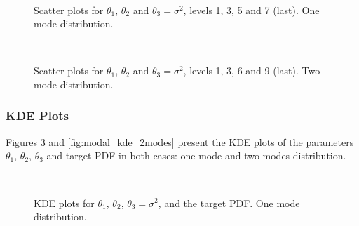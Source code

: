 \begin{figure}[htpb]
\centering
\\
\vspace{-10pt}
\caption{Scatter plots for $\theta_1$, $\theta_2$ and $\theta_3=\sigma^2$, levels 1, 3, 5 and 7 (last). One mode distribution.}
\label{fig:modal_scatter_1mode}
\end{figure}

\begin{figure}[htpb]
\centering
\\
\vspace{-10pt}
\caption{Scatter plots for $\theta_1$, $\theta_2$ and $\theta_3=\sigma^2$, levels 1, 3, 6 and 9 (last). Two-mode distribution.}
\label{fig:modal_scatter_2modes}
\end{figure}

\subsubsection{KDE Plots}

Figures \ref{fig:modal_kde_1mode} and \ref{fig:modal_kde_2modes} present the KDE plots of the parameters $\theta_1$, $\theta_2$, $\theta_3$ and target PDF in both cases: one-mode and two-modes distribution. 



\begin{figure}[hptb]
\centering
{}
\\
\vspace{-10pt}
\caption{KDE plots for $\theta_1$, $\theta_2$, $\theta_3=\sigma^2$, and the target PDF. One mode distribution.}
\label{fig:modal_kde_1mode}
\end{figure}


